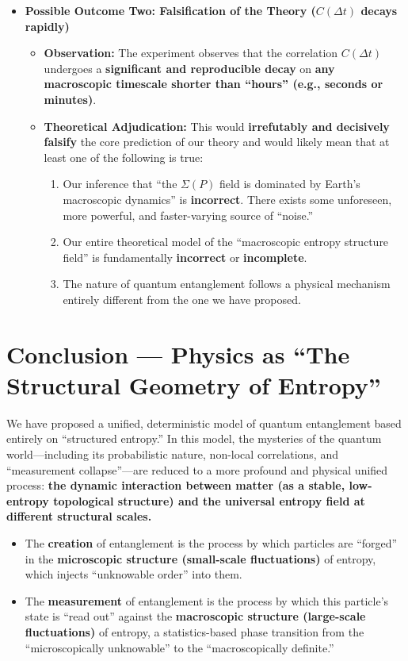 \documentclass[11pt]{article}
\begin{document}
\begin{itemize}
    \item   \textbf{Possible Outcome Two: Falsification of the Theory ($C(\Delta t)$ decays rapidly)}
        \begin{itemize}
            \item   \textbf{Observation:} The experiment observes that the correlation $C(\Delta t)$ undergoes a \textbf{significant and reproducible decay} on \textbf{any macroscopic timescale shorter than ``hours'' (e.g., seconds or minutes)}.
            \item   \textbf{Theoretical Adjudication:} This would \textbf{irrefutably and decisively falsify} the core prediction of our theory and would likely mean that at least one of the following is true:
                \begin{enumerate}
                    \item   Our inference that ``the $\Sigma(P)$ field is dominated by Earth's macroscopic dynamics'' is \textbf{incorrect}. There exists some unforeseen, more powerful, and faster-varying source of ``noise.''
                    \item   Our entire theoretical model of the ``macroscopic entropy structure field'' is fundamentally \textbf{incorrect} or \textbf{incomplete}.
                    \item   The nature of quantum entanglement follows a physical mechanism entirely different from the one we have proposed.
                \end{enumerate}
        \end{itemize}
\end{itemize}


\section{Conclusion — Physics as ``The Structural Geometry of Entropy''}

We have proposed a unified, deterministic model of quantum entanglement based entirely on ``structured entropy.'' In this model, the mysteries of the quantum world—including its probabilistic nature, non-local correlations, and ``measurement collapse''—are reduced to a more profound and physical unified process: \textbf{the dynamic interaction between matter (as a stable, low-entropy topological structure) and the universal entropy field at different structural scales.}

\begin{itemize}
    \item   The \textbf{creation} of entanglement is the process by which particles are ``forged'' in the \textbf{microscopic structure (small-scale fluctuations)} of entropy, which injects ``unknowable order'' into them.
    \item   The \textbf{measurement} of entanglement is the process by which this particle's state is ``read out'' against the \textbf{macroscopic structure (large-scale fluctuations)} of entropy, a statistics-based phase transition from the ``microscopically unknowable'' to the ``macroscopically definite.''
\end{itemize}
\end{document}
